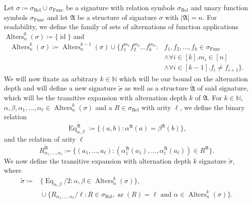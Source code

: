 \begin{definition}
	Let $\sigma\coloneqq \sigma_{\operatorname{Rel}} \operatorname{\dot{\cup}} \sigma_{\operatorname{Func}}$ be a signature with relation symbols $\sigma_{\operatorname{Rel}}$ and unary function symbols $\sigma_{\operatorname{Func}}$ and let $\mathfrak A$ be a structure of signature $\sigma$ with $\vert \mathfrak A \vert=n$.
	For readability, we define the family of sets of alternations of function applications $\operatorname{Alters}_n^0(\sigma)\coloneqq\{\operatorname{id}\}$ and
	\begin{align*}
		\operatorname{Alters}^k_{n}(\sigma)\coloneqq \operatorname{Alters}^{k-1}_{n}(\sigma)\cup\{f_1^{m_1}f_2^{m_2}\dots f_k^{m_k} : & f_1,f_2,\dots, f_k\in \sigma_{\operatorname{Func}} \\ 
		& \land \forall i\in[k]. m_i\in[n] \\ 
		& \land \forall i\in[k-1] . f_{i} \neq f_{i+1}\}.
	\end{align*}
	We will now fixate an arbitrary $k\in\mathbb N$ which will be our bound on the alternation depth and will define a new signature $\widetilde{\sigma}$ as well as a structure $\widetilde{\mathfrak A}$ of said signature, which will be the transitive expansion with alternation depth $k$ of $\mathfrak{A}$.
	For $k\in\mathbb N$, $\alpha,\beta,\alpha_1,\dots,\alpha_\ell\in \operatorname{Alters}^k_n(\sigma)$ and a $R\in \sigma_{\operatorname{Rel}}$ with arity $\ell$, we define the binary relation
	$$\operatorname{Eq}_{\alpha,\beta}^{\widetilde{\mathfrak A}}\coloneqq \{(a,b) : \alpha^{\mathfrak A}(a)=\beta^{\mathfrak A}(b)\},$$
	and the relation of arity $\ell$
	$$R_{\alpha_1,\dots,\alpha_\ell}^{\widetilde{\mathfrak A}} \coloneqq \{(a_1,\dots,a_\ell) : (\alpha_1^{\mathfrak A}(a_1),\dots,\alpha_\ell^{\mathfrak A}(a_\ell))\in R^{\mathfrak A}\}.$$
	We now define the transitive expansion with alternation depth $k$ signature $\widetilde{\sigma}$, where 
	\begin{align*}
		\widetilde{\sigma}\coloneqq & \{\operatorname{Eq}_{\alpha,\beta}/2: \alpha,\beta\in\operatorname{Alters}^k_n(\sigma)\}, \\
		& \operatorname{\dot{\cup}} \{R_{\alpha_1,\dots,\alpha_\ell}/\ell : R\in \sigma_{\operatorname{Rel}},\operatorname{ar}(R)=\ell \text{ and } \alpha\in \operatorname{Alters}^k_n(\sigma)\}.
	\end{align*}
\end{definition}

